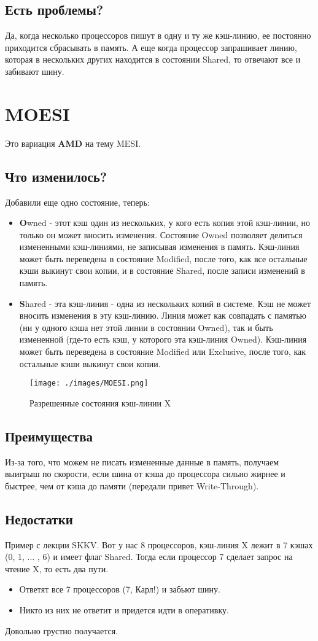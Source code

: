 \documentclass[12pt, a4paper]{article}
\begin{document}
\subsection{Есть проблемы?}
Да, когда несколько процессоров пишут в одну и ту же кэш-линию, ее постоянно приходится сбрасывать в память.
А еще когда процессор запрашивает линию, которая в нескольких других находится в состоянии Shared, то отвечают все и забивают шину.
\section{MOESI}
Это вариация \textbf{AMD} на тему MESI.
\subsection{Что изменилось?}
Добавили еще одно состояние, теперь:
\begin{itemize}
    \item \textbf{O}wned - этот кэш один из нескольких, у кого есть копия этой кэш-линии, но только он может вносить изменения. Состояние Owned позволяет делиться измененными кэш-линиями, не записывая изменения в память. Кэш-линия может быть переведена в состояние Modified, после того, как все остальные кэши выкинут свои копии, и в состояние Shared, после записи изменений в память.
    \item \textbf{S}hared - эта кэш-линия - одна из нескольких копий в системе. Кэш не может вносить изменения в эту кэш-линию. Линия может как совпадать с памятью (ни у одного кэша нет этой линии в состоянии Owned), так и быть измененной (где-то есть кэш, у которого эта кэш-линия Owned). Кэш-линия может быть переведена в состояние Modified или Exclusive, после того, как остальные кэши выкинут свои копии.
\end{itemize}
\begin{figure}[h]
    \centering
    \texttt{[image: ./images/MOESI.png]}
    \caption{Разрешенные состояния кэш-линии X}
    \label{fig:MOESI}
\end{figure}
\subsection{Преимущества}
Из-за того, что можем не писать измененные данные в память, получаем выигрыш по скорости, если шина от кэша до процессора сильно жирнее и быстрее, чем от кэша до памяти (передали привет Write-Through).
\subsection{Недостатки}
Пример с лекции SKKV. Вот у нас 8 процессоров, кэш-линия X лежит в 7 кэшах (0, 1, ... , 6) и имеет флаг Shared. Тогда если процессор 7 сделает запрос на чтение X, то есть два пути.
\begin{itemize}
    \item Ответят все 7 процессоров (7, Карл!) и забьют шину.
    \item Никто из них не ответит и придется идти в оперативку.
\end{itemize}
Довольно грустно получается.
\end{document}
